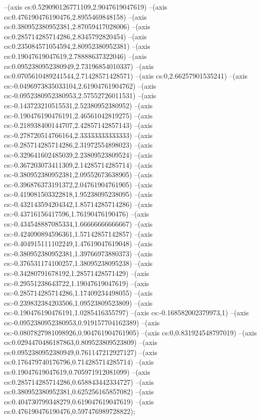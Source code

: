 --(axis cs:0.529090126771109,2.9047619047619)
--(axis cs:0.476190476190476,2.8955469848158)
--(axis cs:0.380952380952381,2.87059417028006)
--(axis cs:0.285714285714286,2.8345792820454)
--(axis cs:0.235084571054594,2.80952380952381)
--(axis cs:0.19047619047619,2.78888637322046)
--(axis cs:0.0952380952380949,2.73196854010337)
--(axis cs:0.0705610489241544,2.71428571428571)
--(axis cs:0,2.66257901535241)
--(axis cs:-0.0496973835033104,2.61904761904762)
--(axis cs:-0.0952380952380953,2.57552726011531)
--(axis cs:-0.143723210515531,2.52380952380952)
--(axis cs:-0.190476190476191,2.46561042819275)
--(axis cs:-0.218938400144707,2.42857142857143)
--(axis cs:-0.278720514766164,2.33333333333333)
--(axis cs:-0.285714285714286,2.31972554898023)
--(axis cs:-0.329641602485039,2.23809523809524)
--(axis cs:-0.367203073411309,2.14285714285714)
--(axis cs:-0.380952380952381,2.09552673638905)
--(axis cs:-0.396876373191372,2.04761904761905)
--(axis cs:-0.419081503322818,1.95238095238095)
--(axis cs:-0.432143594204342,1.85714285714286)
--(axis cs:-0.43716156417596,1.76190476190476)
--(axis cs:-0.434548887085334,1.66666666666667)
--(axis cs:-0.424090894596361,1.57142857142857)
--(axis cs:-0.404915111102249,1.47619047619048)
--(axis cs:-0.380952380952381,1.39766973880373)
--(axis cs:-0.376531174100257,1.38095238095238)
--(axis cs:-0.34280791678192,1.28571428571429)
--(axis cs:-0.29551238643722,1.19047619047619)
--(axis cs:-0.285714285714286,1.17409234498055)
--(axis cs:-0.239832384203506,1.09523809523809)
--(axis cs:-0.190476190476191,1.0285416355797)
--(axis cs:-0.168582002379973,1)
--(axis cs:-0.0952380952380953,0.919157704162389)
--(axis cs:-0.0807827981098926,0.904761904761905)
--(axis cs:0,0.831924548797019)
--(axis cs:0.0294470486187863,0.809523809523809)
--(axis cs:0.0952380952380949,0.761147212927127)
--(axis cs:0.176479740176796,0.714285714285714)
--(axis cs:0.19047619047619,0.705971912081099)
--(axis cs:0.285714285714286,0.658843442334727)
--(axis cs:0.380952380952381,0.625256165857082)
--(axis cs:0.404730799348279,0.619047619047619)
--(axis cs:0.476190476190476,0.597476989728822);

